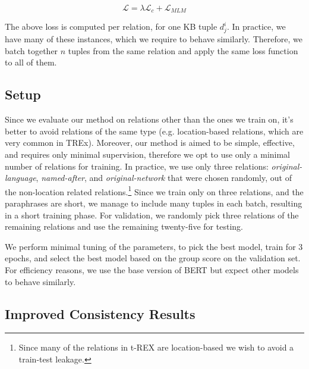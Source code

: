 \[
\mathcal{L} = \lambda \mathcal{L}_c + \mathcal{L}_{MLM}
\]

The above loss is computed per relation, for one KB tuple $d_j^i$. In practice, we have many of these instances, which we require to behave similarly. Therefore, we batch together $n$ tuples from the same relation and apply the same loss function to all of them.


\subsection{Setup}

Since we evaluate our method on relations other than the ones we train on, it's better to avoid relations of the same type (e.g. location-based relations, which are very common in TREx).
Moreover, our method is aimed to be simple, effective, and requires only minimal supervision, therefore we opt to use only a minimal number of relations for training.
In practice, we use only three relations: \textit{original-language}, \textit{named-after}, and \textit{original-network} that were chosen randomly, out of the non-location related relations.\footnote{Since many of the relations in t-REX are location-based we wish to avoid a train-test leakage.} %
Since we train only on three relations, and the paraphrases are short, we manage to include many tuples in each batch, resulting in a short training phase.
For validation, we randomly pick three relations of the remaining relations and use the remaining twenty-five for testing.

We perform minimal tuning of the parameters, to pick the best model, train for 3 epochs, and select the best model based on the group score on the validation set.
For efficiency reasons, we use the base version of BERT but expect other models to behave similarly.


\subsection{Improved Consistency Results}



